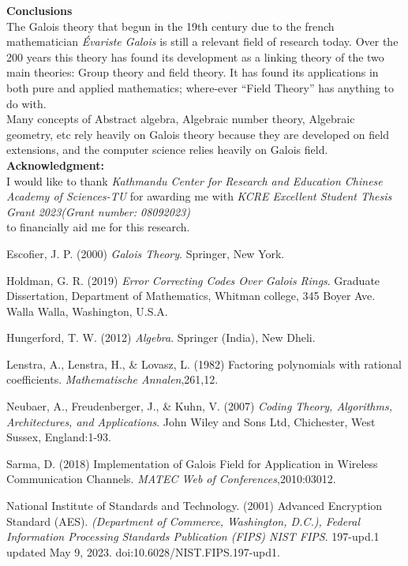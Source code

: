 \documentclass[a4paper,twoside,10pt]{article}
\theoremstyle{plain}
\theoremstyle{definition}
\begin{document}
\vspace{5mm}
\textbf{Conclusions}\\
The Galois theory that begun in the 19th century due to the french mathematician \textit{Évariste Galois} is still a relevant field of research today. Over the 200 years this theory has found its development as a linking theory of the two main theories: Group theory and field theory. It has found its applications in both pure and applied mathematics; where-ever ``Field Theory'' has anything to do with.\\
Many concepts of Abstract algebra, Algebraic number theory, Algebraic geometry, etc rely heavily on Galois theory because they are developed on field extensions, and the computer science relies heavily on Galois field.\\

\textbf{Acknowledgment:} \\
I would like to thank \textit{Kathmandu Center for Research and Education Chinese Academy of Sciences-TU} for awarding me with
\textit{KCRE Excellent Student Thesis Grant 2023(Grant number: 08092023)}\\ to financially aid me for this research.
\vspace{7mm}



\begin{thebibliography}{9}
Escofier, J. P. (2000) \emph{Galois Theory}. Springer, New York.

Holdman, G. R. (2019) \emph{Error Correcting Codes  Over Galois Rings}. Graduate Dissertation, Department of Mathematics, Whitman college, 345 Boyer Ave.
Walla Walla, Washington, U.S.A.

Hungerford, T. W. (2012) \emph{Algebra}. Springer (India), New Dheli.

Lenstra, A., Lenstra, H.,  \& Lovasz, L. (1982)  Factoring polynomials with rational coefficients. \emph{Mathematische Annalen},261,12.

Neubaer, A.,  Freudenberger, J.,  \& Kuhn, V. (2007) \emph{Coding Theory, Algorithms, Architectures, and Applications}. John Wiley and Sons Ltd, Chichester, West Sussex, England:1-93.

Sarma, D. (2018) Implementation of Galois Field for Application in Wireless Communication Channels. \emph{MATEC Web of Conferences},2010:03012.

National Institute of Standards and Technology. (2001) Advanced Encryption
Standard (AES). \emph{(Department of Commerce, Washington, D.C.), Federal Information Processing Standards Publication (FIPS) NIST FIPS}. 197-upd.1 updated May 9, 2023. doi:10.6028/NIST.FIPS.197-upd1.

\end{thebibliography}
\end{document}

